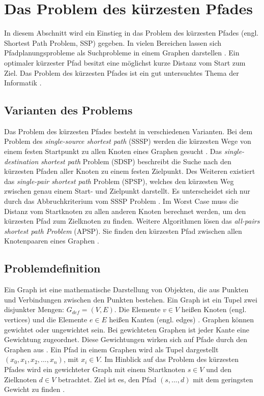 \chapter{Das Problem des kürzesten Pfades}

In diesem Abschnitt wird ein Einstieg in das Problem des kürzesten Pfades (engl. Shortest Path Problem, SSP) gegeben. In vielen Bereichen lassen sich Pfadplanungsprobleme als Suchprobleme in einem Graphen darstellen \cite{HartNilssonandRaphael.1968}. Ein optimaler kürzester Pfad besitzt eine möglichst kurze Distanz vom Start zum Ziel. Das Problem des kürzesten Pfades ist ein gut untersuchtes Thema der Informatik \cite[S.1]{Madkour.2017}.


\section{Varianten des Problems}

Das Problem des kürzesten Pfades besteht in verschiedenen Varianten. Bei dem Problem des \textit{single-source shortest path} (SSSP) werden die kürzesten Wege von einem festen Startpunkt zu allen Knoten eines Graphen gesucht \cite[S.644]{Cormen.2009}. Das \textit{single-destination shortest path} Problem (SDSP)  beschreibt die Suche nach den kürzesten Pfaden aller Knoten zu einem festen Zielpunkt. Des Weiteren existiert das \textit{single-pair shortest path} Problem (SPSP), welches den kürzesten Weg zwischen genau einem Start- und Zielpunkt darstellt. Es unterscheidet sich nur durch das Abbruchkriterium vom SSSP Problem \cite{Ottmann.2017}. Im Worst Case muss die Distanz vom Startknoten zu allen anderen Knoten berechnet werden, um den kürzesten Pfad zum Zielknoten zu finden. Weitere Algorithmen lösen das \textit{all-pairs shortest path Problem} (APSP). Sie finden den kürzesten Pfad zwischen allen Knotenpaaren eines Graphen \cite[S.644]{Cormen.2009}.


\section{Problemdefinition}

Ein Graph ist eine mathematische Darstellung von Objekten, die aus Punkten und Verbindungen zwischen den Punkten bestehen. 
Ein Graph ist ein Tupel zwei disjunkter Mengen: $G_{def}= (V,E)$. Die Elemente $v \in V$ heißen Knoten (engl. vertices) und die Elemente $e \in E$ heißen Kanten (engl. edges) \cite[S.15]{Gross.2004}. 
Graphen können gewichtet oder ungewichtet sein. Bei gewichteten Graphen ist jeder Kante eine Gewichtung zugeordnet. 
Diese Gewichtungen wirken sich auf Pfade durch den Graphen aus \cite[S.18]{Gross.2004}. 
Ein Pfad in einem Graphen wird als Tupel dargestellt $\left ( x_{0}, x_{1}, x_{2}, ..., x_{n} \right )$, mit $x_{i} \in V$. 
Im Hinblick auf das Problem des kürzesten Pfades wird ein gewichteter Graph mit einem Startknoten $s \in V$ und den Zielknoten $d \in V$ betrachtet. 
Ziel ist es, den Pfad  $\left ( s, ..., d \right )$ mit dem geringsten Gewicht zu finden \cite[S.4]{Madkour.2017}.


